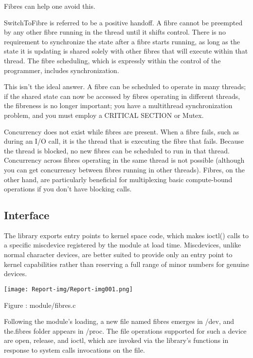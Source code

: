 Fibres can help one avoid this.

SwitchToFibre is referred to be a {\textquotedbl}positive handoff.{\textquotedbl} A fibre cannot be preempted by any other fibre running in the thread until it shifts control. There is no requirement to synchronize the state after a fibre starts running, as long as the state it is updating is shared solely with other fibres that will execute within that thread. The fibre scheduling, which is expressly within the control of the programmer, includes synchronization.

This isn't the ideal answer. A fibre can be scheduled to operate in many threads; if the shared state can now be accessed by fibres operating in different threads, the fibreness is no longer important; you have a multithread synchronization problem, and you must employ a CRITICAL SECTION or Mutex.

Concurrency does not exist while fibres are present. When a fibre fails, such as during an I/O call, it is the thread that is executing the fibre that fails. Because the thread is blocked, no new fibres can be scheduled to run in that thread. Concurrency across fibres operating in the same thread is not possible (although you can get concurrency between fibres running in other threads). Fibres, on the other hand, are particularly beneficial for multiplexing basic compute-bound operations if you don't have blocking calls.

\subsection{Interface}
The library exports entry points to kernel space code, which makes ioctl() calls to a specific miscdevice registered by the module at load time. Miscdevices, unlike {\textquotedbl}normal{\textquotedbl} character devices, are better suited to provide only an entry point to kernel capabilities rather than reserving a full range of minor numbers for genuine devices.

 \texttt{[image: Report-img/Report-img001.png]} 

Figure : module/fibres.c

Following the module's loading, a new file named fibres emerges in /dev, and the.fibres folder appears in /proc. The file operations supported for such a device are open, release, and ioctl, which are invoked via the library's functions in response to system calls invocations on the file.


